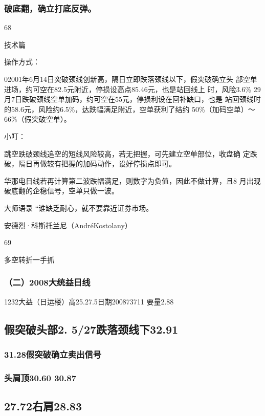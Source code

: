\documentclass{article}
\begin{document}
\subsubsection{破底翻，确立打底反弹。}

68

\clearpage

技术篇

操作方式：

02001年6月14日突破颈线创新高，隔日立即跌落颈线以下，假突破确立头 部空单进场，约可空在82.5元附近，停损设高点85.46元，也是站回线上 时，风险3.6\% 29月7日跌破颈线空单加码，约可空在55元，停损利设在回补缺口，也是 站回颈线时的58.6元，风险约6.5\%，达跌幅满足附近，空单获利了结约 50\%（加码空单）～66\%（假突破空单）。

小叮：

跳空跌破颈线追空的短线风险较高，若无把握，可先建立空单部位，收盘确 定跌破，隔日再做较有把握的加码动作，设好停损点即可。

华那电日线若再计算第二波跌幅满足，则数字为负值，因此不做计算，且8 月出现破底翻的企稳信号，空单只做一波。

大师语录 “谁缺乏耐心，就不要靠近证券市场。

安德烈·科斯托兰尼（AndréKostolany）

69

\clearpage

多空转折一手抓

\subsubsection{（二）2008大统益日线}

1232大益（日运楼）高25.27.5日期200873711 要量2.88

\subsection{假突破头部2. 5/27跌落颈线下32.91}

\subsubsection{31.28假突破确立卖出信号}

\subsubsection{头肩顶30.60 30.87}

\subsection{27.72右肩28.83}
\end{document}
